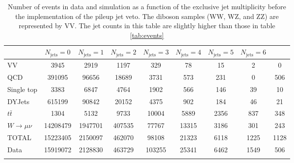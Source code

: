 \documentclass[oneside, letterpaper, oldfontcommands]{memoir}
\begin{document}
\begin{table}\small
\centering
\caption{Number of events in data and simulation as a function of the exclusive jet multiplicity before the implementation of the pileup jet veto. The diboson samples (WW, WZ, and ZZ) are represented by VV. The jet counts in this table are slightly higher than those in table \ref{tab:events}}
\begin{tabular}{l|cccccccc}
  &  $N_{\text{jets}} = 0 $ & $N_{\text{jets}} = 1 $ & $N_{\text{jets}} = 2 $ & $N_{\text{jets}} = 3 $ & $N_{\text{jets}} = 4 $ & $N_{\text{jets}} = 5 $ & $N_{\text{jets}} = 6 $ \\ \hline
   VV        & 3945 & 2919 & 1197 & 329 & 78 & 15 & 2 & 0 \\
   QCD        & 391095 & 96656 & 18689 & 3731 & 573 & 231 & 0 & 506 \\
   Single top        & 3383 & 6847 & 4764 & 1902 & 566 & 146 & 39 & 10 \\
   DYJets        & 615199 & 90842 & 20152 & 4375 & 902 & 184 & 46 & 21 \\
   $t\bar{t}$        & 1304 & 5132 & 9733 & 10004 & 5889 & 2356 & 837 & 348 \\
   $W \rightarrow \mu\nu$        & 14208479 & 1947701 & 407535 & 77767 & 13315 & 3186 & 301 & 243 \\
 \hline
 TOTAL & 15223405 & 2150097 & 462070 & 98108 & 21323 & 6118 & 1225 & 1128 \\
 \hline
 Data          & 15919072 & 2128830 & 463729 & 103255 & 25341 & 6462 & 1549 & 506 \\
  \label{tab:pumva}
 \end{tabular}
 \end{table}  
          
\end{document}
